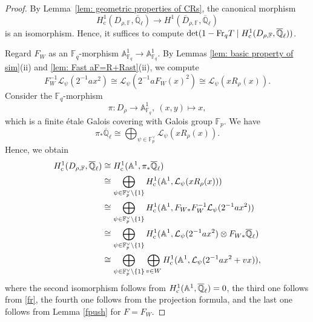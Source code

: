 \documentclass[12pt,a4paper]{amsart}
\theoremstyle{definition}
\def\A{{\mathbb A}}
\def\F{{\mathbb F}}
\def\Ql{\overline{\mathbb{Q}}_\ell}
\theoremstyle{remark}
\begin{document}
\begin{proof}
By Lemma~\ref{lem: geometric properties of CRs}, the canonical morphism 
\[
H^1_{\mathrm{c}}(D_{\rho,\F},\Ql)\to H^1(\overline{D}_{\rho,\F},\Ql)
\]
is an isomorphism. Hence, it suffices to compute $\det(1-{\rm Fr}_q T\mid H^1_{\mathrm{c}}(D_{\rho,\F},\Ql))$. 



Regard $F_W$ as an $\F_q$-morphism $\A^1_{\F_q}\to \A^1_{\F_q}$. 
By Lemmas \ref{lem: basic property of sim}(ii) and \ref{lem: Fast aF=R+Rast}(ii), we compute 
\begin{equation}\label{fr}
F_W^{-1}\mathcal{L}_\psi(2^{-1}a x^2)\cong 
\mathcal{L}_\psi(2^{-1} a F_W(x)^2)\cong 
\mathcal{L}_\psi(xR_\rho(x)). 
\end{equation}
Consider the $\F_q$-morphism 
\[\pi\colon D_{\rho}\to \A^1_{\F_q},\ (x,y)\mapsto x,\]
which is 
a finite \'etale Galois covering with Galois group $\F_p$. We have \[
\pi_{\ast} \Ql \cong 
\bigoplus_{\psi \in \F_p^{\vee}} \mathcal{L}_{\psi}(x R_\rho(x)). \]
Hence, we obtain 
\begin{align*}
H^1_{\mathrm{c}}(D_{\rho,\F},\Ql)
&\cong
H_{\rm c}^1(\mathbb{A}^1,\pi_{\ast} \Ql)\\
&\cong  \bigoplus_{\psi\in\F_p^\vee\setminus\{1\}}H^1_{\mathrm{c}}(\A^1,\mathcal{L}_\psi(xR_\rho(x)))\\
&\cong  \bigoplus_{\psi\in\F_p^\vee\setminus\{1\}}H^1_{\mathrm{c}}(\A^1,F_{W\ast} F_W^{-1} \mathcal{L}_\psi(2^{-1}ax^2)) \\
&\cong \bigoplus_{\psi\in\F_p^\vee\setminus\{1\}}H^1_{\mathrm{c}}(\A^1,\mathcal{L}_\psi(2^{-1} a x^2)\otimes F_{W\ast}\Ql)\\
& \cong \bigoplus_{\psi\in\F_p^\vee\setminus\{1\}}\bigoplus_{v\in W}H^1_{\mathrm{c}}(\A^1,\mathcal{L}_\psi(2^{-1} a x^2+vx)), 
\end{align*}
where the second isomorphism follows from 
 $H_{\rm c}^1(\mathbb{A}^1,\Ql)=0$, 
the third one follows from \eqref{fr},  
the fourth one follows from
the projection formula, and 
the last one follows from Lemma \ref{fpush} for $F=F_W$. 



\end{proof}
\end{document}
